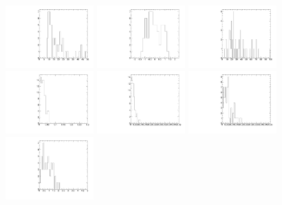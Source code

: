 \begin{figure}
  \centering
  \includegraphics[width=0.3\textwidth]{Figures/AfterBDTCut_pt_Barrel.pdf}
  \includegraphics[width=0.3\textwidth]{Figures/AfterBDTCut_eta_Barrel.pdf}
  \includegraphics[width=0.3\textwidth]{Figures/AfterBDTCut_fls3d_Barrel.pdf}
  \includegraphics[width=0.3\textwidth]{Figures/AfterBDTCut_alpha_Barrel.pdf}
  \includegraphics[width=0.3\textwidth]{Figures/AfterBDTCut_maxdoca_Barrel.pdf}
  \includegraphics[width=0.3\textwidth]{Figures/AfterBDTCut_pvip_Barrel.pdf}
  \includegraphics[width=0.3\textwidth]{Figures/AfterBDTCut_pvips_Barrel.pdf}

\end{figure}
